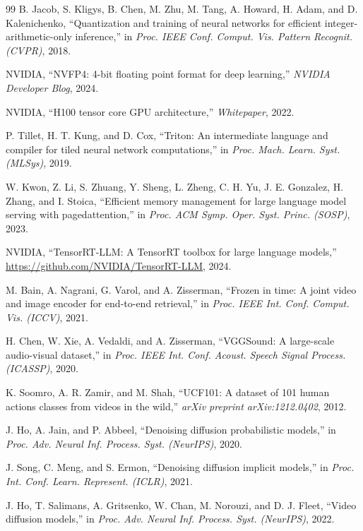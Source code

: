 \documentclass[journal]{IEEEtran}
\theoremstyle{definition}
\theoremstyle{remark}
\begin{document}
\begin{thebibliography}{99}
B. Jacob, S. Kligys, B. Chen, M. Zhu, M. Tang, A. Howard, H. Adam, and D. Kalenichenko, ``Quantization and training of neural networks for efficient integer-arithmetic-only inference,'' in \textit{Proc. IEEE Conf. Comput. Vis. Pattern Recognit. (CVPR)}, 2018.

NVIDIA, ``NVFP4: 4-bit floating point format for deep learning,'' \textit{NVIDIA Developer Blog}, 2024.

NVIDIA, ``H100 tensor core GPU architecture,'' \textit{Whitepaper}, 2022.

P. Tillet, H. T. Kung, and D. Cox, ``Triton: An intermediate language and compiler for tiled neural network computations,'' in \textit{Proc. Mach. Learn. Syst. (MLSys)}, 2019.

W. Kwon, Z. Li, S. Zhuang, Y. Sheng, L. Zheng, C. H. Yu, J. E. Gonzalez, H. Zhang, and I. Stoica, ``Efficient memory management for large language model serving with pagedattention,'' in \textit{Proc. ACM Symp. Oper. Syst. Princ. (SOSP)}, 2023.

NVIDIA, ``TensorRT-LLM: A TensorRT toolbox for large language models,'' \url{https://github.com/NVIDIA/TensorRT-LLM}, 2024.

M. Bain, A. Nagrani, G. Varol, and A. Zisserman, ``Frozen in time: A joint video and image encoder for end-to-end retrieval,'' in \textit{Proc. IEEE Int. Conf. Comput. Vis. (ICCV)}, 2021.

H. Chen, W. Xie, A. Vedaldi, and A. Zisserman, ``VGGSound: A large-scale audio-visual dataset,'' in \textit{Proc. IEEE Int. Conf. Acoust. Speech Signal Process. (ICASSP)}, 2020.

K. Soomro, A. R. Zamir, and M. Shah, ``UCF101: A dataset of 101 human actions classes from videos in the wild,'' \textit{arXiv preprint arXiv:1212.0402}, 2012.

J. Ho, A. Jain, and P. Abbeel, ``Denoising diffusion probabilistic models,'' in \textit{Proc. Adv. Neural Inf. Process. Syst. (NeurIPS)}, 2020.

J. Song, C. Meng, and S. Ermon, ``Denoising diffusion implicit models,'' in \textit{Proc. Int. Conf. Learn. Represent. (ICLR)}, 2021.

J. Ho, T. Salimans, A. Gritsenko, W. Chan, M. Norouzi, and D. J. Fleet, ``Video diffusion models,'' in \textit{Proc. Adv. Neural Inf. Process. Syst. (NeurIPS)}, 2022.


\end{thebibliography}
\end{document}
